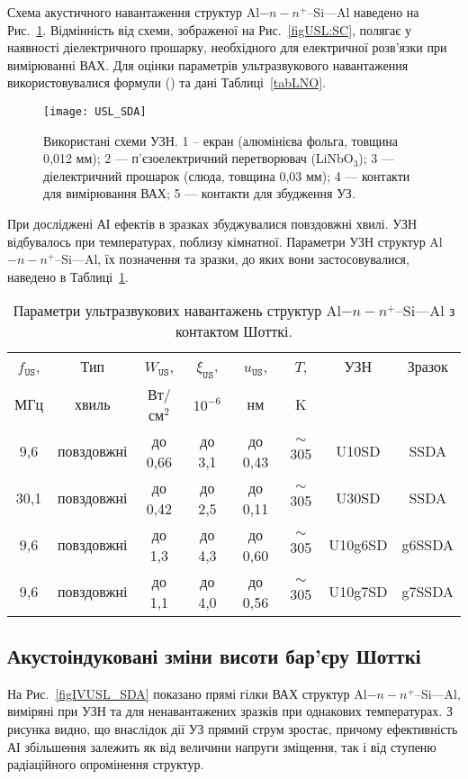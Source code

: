 Схема акустичного навантаження структур Al$-n-n^+$--Si---Al наведено на Рис.~\ref{figUSL:SDA}.
Відмінність від схеми, зображеної на Рис.~\ref{figUSL:SC}, полягає у наявності діелектричного прошарку,
необхідного для електричної розв'язки при вимірюванні ВАХ.
Для оцінки параметрів ультразвукового навантаження використовувалися формули () та дані Таблиці~\ref{tabLNO}.

\begin{figure}%
\center
\texttt{[image: USL\_SDA]}%
\caption{\label{figUSL:SDA}
Використані схеми УЗН.
1 --  екран (алюмінієва фольга, товщина 0,012 мм);
2 --- п'єзоелектричний перетворювач (LiNbO$_3$);
3 --- діелектричний прошарок (слюда, товщина 0,03 мм);
4 --- контакти для вимірювання ВАХ;
5 --- контакти для збудження УЗ.
}
\end{figure}



При досліджені АІ ефектів в зразках збуджувалися повздовжні хвилі.
УЗН відбувалось при температурах, поблизу кімнатної.
Параметри УЗН структур Al$-n-n^+$--Si---Al, їх позначення та зразки, до яких вони застосовувалися, наведено в Таблиці~\ref{tabUSL:SD}.

\begin{table}
\caption{\label{tabUSL:SD}Параметри ультразвукових навантажень структур Al$-n-n^+$--Si---Al з контактом Шотткі.
}
\center
\begin{tabular}{|c|c|c|c|c|c|c|c|}
\hline
$f_\mathtt{US}$,&Тип&$W_{\mathtt{US}}$,&$\xi_{\mathtt{US}}$,&$u_{\mathtt{US}}$,&$T$,&УЗН&Зразок\\
МГц&хвиль&Вт/см$^2$&$10^{-6}$&нм&K&&\\
\hline
9,6&повздовжні&до 0,66&до 3,1&до 0,43&$\sim$305&U10SD&SSDA\\ \hline
30,1&повздовжні&до 0,42&до 2,5&до 0,11&$\sim$305&U30SD&SSDA\\ \hline
9,6&повздовжні&до 1,3&до 4,3&до 0,60&$\sim$305&U10g6SD&g6SSDA\\ \hline
9,6&повздовжні&до 1,1&до 4,0&до 0,56&$\sim$305&U10g7SD&g7SSDA\\ \hline
\end{tabular}
\end{table}


\subsection{Акустоіндуковані зміни висоти бар'єру Шотткі}

На Рис.~\ref{figIVUSL_SDA} показано прямі гілки ВАХ структур Al$-n-n^+$--Si---Al, виміряні при УЗН та для ненавантажених
зразків при однакових температурах.
З рисунка видно, що внаслідок дії УЗ прямий струм зростає, причому
ефективність АІ збільшення залежить як від величини напруги зміщення, так і від ступеню радіаційного опромінення структур.

